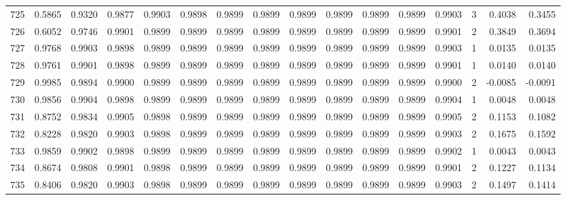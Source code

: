 \begin{tabular}{lrrrrrrrrrrrrrrr}
725 &      0.5865 &  0.9320 &  0.9877 &  0.9903 &  0.9898 &  0.9899 &  0.9899 &  0.9899 &  0.9899 &  0.9899 &   0.9899 &     0.9903 &      3 &                    0.4038 &                     0.3455 \\
726 &      0.6052 &  0.9746 &  0.9901 &  0.9899 &  0.9899 &  0.9899 &  0.9899 &  0.9899 &  0.9899 &  0.9899 &   0.9899 &     0.9901 &      2 &                    0.3849 &                     0.3694 \\
727 &      0.9768 &  0.9903 &  0.9898 &  0.9899 &  0.9899 &  0.9899 &  0.9899 &  0.9899 &  0.9899 &  0.9899 &   0.9899 &     0.9903 &      1 &                    0.0135 &                     0.0135 \\
728 &      0.9761 &  0.9901 &  0.9898 &  0.9899 &  0.9899 &  0.9899 &  0.9899 &  0.9899 &  0.9899 &  0.9899 &   0.9899 &     0.9901 &      1 &                    0.0140 &                     0.0140 \\
729 &      0.9985 &  0.9894 &  0.9900 &  0.9899 &  0.9899 &  0.9899 &  0.9899 &  0.9899 &  0.9899 &  0.9899 &   0.9899 &     0.9900 &      2 &                   -0.0085 &                    -0.0091 \\
730 &      0.9856 &  0.9904 &  0.9898 &  0.9899 &  0.9899 &  0.9899 &  0.9899 &  0.9899 &  0.9899 &  0.9899 &   0.9899 &     0.9904 &      1 &                    0.0048 &                     0.0048 \\
731 &      0.8752 &  0.9834 &  0.9905 &  0.9898 &  0.9899 &  0.9899 &  0.9899 &  0.9899 &  0.9899 &  0.9899 &   0.9899 &     0.9905 &      2 &                    0.1153 &                     0.1082 \\
732 &      0.8228 &  0.9820 &  0.9903 &  0.9898 &  0.9899 &  0.9899 &  0.9899 &  0.9899 &  0.9899 &  0.9899 &   0.9899 &     0.9903 &      2 &                    0.1675 &                     0.1592 \\
733 &      0.9859 &  0.9902 &  0.9898 &  0.9899 &  0.9899 &  0.9899 &  0.9899 &  0.9899 &  0.9899 &  0.9899 &   0.9899 &     0.9902 &      1 &                    0.0043 &                     0.0043 \\
734 &      0.8674 &  0.9808 &  0.9901 &  0.9898 &  0.9899 &  0.9899 &  0.9899 &  0.9899 &  0.9899 &  0.9899 &   0.9899 &     0.9901 &      2 &                    0.1227 &                     0.1134 \\
735 &      0.8406 &  0.9820 &  0.9903 &  0.9898 &  0.9899 &  0.9899 &  0.9899 &  0.9899 &  0.9899 &  0.9899 &   0.9899 &     0.9903 &      2 &                    0.1497 &                     0.1414 \\

\end{tabular}
